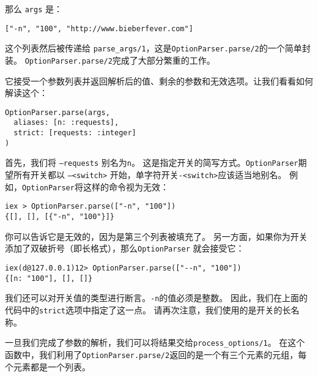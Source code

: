 那么 \texttt{args} 是：

\begin{code}{}
\begin{verbatim}
["-n", "100", "http://www.bieberfever.com"]
\end{verbatim}
\end{code}

这个列表然后被传递给 \texttt{parse\_args/1}，这是\texttt{OptionParser.parse/2}的一个简单封装。
\texttt{OptionParser.parse/2}完成了大部分繁重的工作。

它接受一个参数列表并返回解析后的值、剩余的参数和无效选项。让我们看看如何解读这个：

\begin{code}{}
\begin{verbatim}
OptionParser.parse(args,
  aliases: [n: :requests],
  strict: [requests: :integer]
)
\end{verbatim}
\end{code}

首先，我们将 \texttt{--requests} 别名为\texttt{n}。
这是指定开关的简写方式。\texttt{OptionParser}期望所有开关都以 \texttt{--<switch>} 开始，单字符开关\texttt{-<switch>}应该适当地别名。
例如，\texttt{OptionParser}将这样的命令视为无效：

\begin{code}{}
\begin{verbatim}
iex > OptionParser.parse(["-n", "100"])
{[], [], [{"-n", "100"}]}
\end{verbatim}
\end{code}

你可以告诉它是无效的，因为是第三个列表被填充了。
另一方面，如果你为开关添加了双破折号（即长格式），那么\texttt{OptionParser} 就会接受它：

\begin{code}{}
\begin{verbatim}
iex(d@127.0.0.1)12> OptionParser.parse(["--n", "100"])
{[n: "100"], [], []}
\end{verbatim}
\end{code}

我们还可以对开关值的类型进行断言。\texttt{-n}的值必须是整数。
因此，我们在上面的代码中的\texttt{strict}选项中指定了这一点。
请再次注意，我们使用的是开关的长名称。

一旦我们完成了参数的解析，我们可以将结果交给\texttt{process\_options/1}。
在这个函数中，我们利用了\texttt{OptionParser.parse/2}返回的是一个有三个元素的元组，每个元素都是一个列表。

